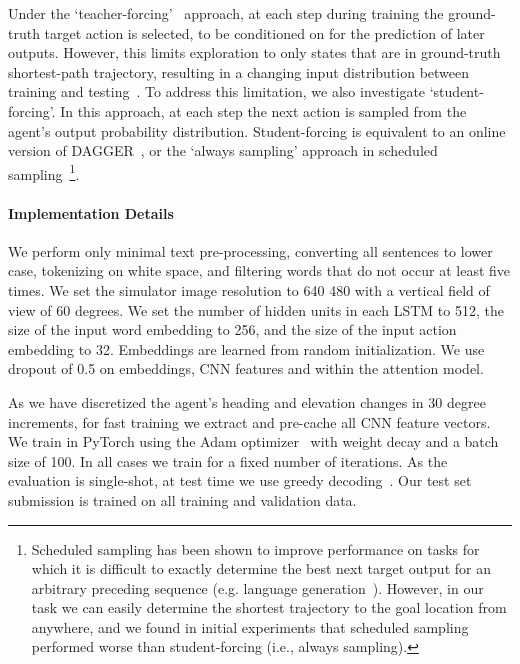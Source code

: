 \documentclass[10pt,twocolumn,letterpaper]{article}
\begin{document}
Under the `teacher-forcing'~\cite{lamb2016professor} approach, at each step during training the ground-truth target action  is selected, to be conditioned on for the prediction of later outputs. However, this limits exploration to only states that are in ground-truth shortest-path trajectory, resulting in a changing input distribution between training and testing~\cite{ross2011reduction,lamb2016professor}. To address this limitation, we also investigate `student-forcing'. In this approach, at each step the next action is sampled from the agent's output probability distribution. Student-forcing is equivalent to an online version of DAGGER~\cite{ross2011reduction}, or the `always sampling' approach in scheduled sampling~\cite{bengio2015scheduled}\footnote{Scheduled sampling has been shown to improve performance on tasks for which it is difficult to exactly determine the best next target output  for an arbitrary preceding sequence (e.g. language generation~\cite{bengio2015scheduled}). However, in our task we can easily determine the shortest trajectory to the goal location from anywhere, and we found in initial experiments that scheduled sampling performed worse than student-forcing (i.e., always sampling).}.


\vspace{-0.3cm}
\paragraph{Implementation Details}

We perform only minimal text pre-processing, converting all sentences to lower case, tokenizing on white space, and filtering words that do not occur at least five times. We set the simulator image resolution to 640  480 with a vertical field of view of 60 degrees. We set the number of hidden units in each LSTM to 512, the size of the input word embedding to 256, and the size of the input action embedding to 32. Embeddings are learned from random initialization. We use dropout of 0.5 on embeddings, CNN features and within the attention model.

As we have discretized the agent's heading and elevation changes in 30 degree increments, for fast training we extract and pre-cache all CNN feature vectors. We train in PyTorch using the Adam optimizer~\cite{kingma2014adam} with weight decay and a batch size of 100. In all cases we train for a fixed number of iterations. As the evaluation is single-shot, at test time we use greedy decoding~\cite{scst2016}. Our test set submission is trained on all training and validation data.
 
\end{document}
